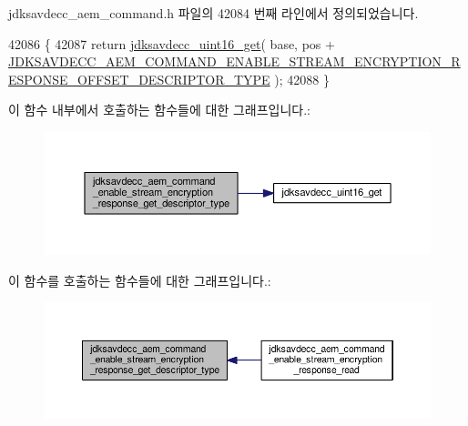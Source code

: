 jdksavdecc\+\_\+aem\+\_\+command.\+h 파일의 42084 번째 라인에서 정의되었습니다.


\begin{DoxyCode}
42086 \{
42087     \textcolor{keywordflow}{return} \hyperlink{group__endian_ga3fbbbc20be954aa61e039872965b0dc9}{jdksavdecc\_uint16\_get}( base, pos + 
      \hyperlink{group__command__enable__stream__encryption__response_gaa8748d3869839a590e7974a68d32981d}{JDKSAVDECC\_AEM\_COMMAND\_ENABLE\_STREAM\_ENCRYPTION\_RESPONSE\_OFFSET\_DESCRIPTOR\_TYPE}
       );
42088 \}
\end{DoxyCode}


이 함수 내부에서 호출하는 함수들에 대한 그래프입니다.\+:
\nopagebreak
\begin{figure}[H]
\begin{center}
\leavevmode
\includegraphics[width=350pt]{group__command__enable__stream__encryption__response_ga681542713a13d9124af2ddbd9d4cb9ff_cgraph}
\end{center}
\end{figure}




이 함수를 호출하는 함수들에 대한 그래프입니다.\+:
\nopagebreak
\begin{figure}[H]
\begin{center}
\leavevmode
\includegraphics[width=350pt]{group__command__enable__stream__encryption__response_ga681542713a13d9124af2ddbd9d4cb9ff_icgraph}
\end{center}
\end{figure}


